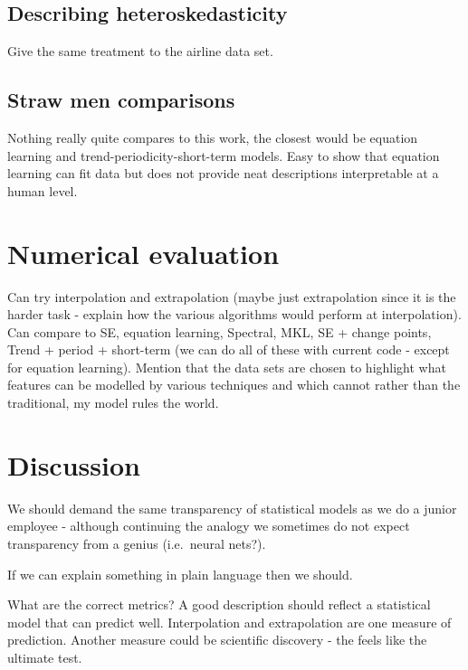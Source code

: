 \documentclass{article}
\def\ie{i.e.\ }
\def\eg{e.g.\ }
\begin{document}
\subsection{Describing heteroskedasticity}
\label{sec:airline}

Give the same treatment to the airline data set.

\subsection{Straw men comparisons}

Nothing really quite compares to this work, the closest would be equation learning and trend-periodicity-short-term models.
Easy to show that equation learning can fit data but does not provide neat descriptions interpretable at a human level.

\section{Numerical evaluation}

Can try interpolation and extrapolation (maybe just extrapolation since it is the harder task - explain how the various algorithms would perform at interpolation).
Can compare to SE, equation learning, Spectral, MKL, SE + change points, Trend + period + short-term (we can do all of these with current code - except for equation learning).
Mention that the data sets are chosen to highlight what features can be modelled by various techniques and which cannot rather than the traditional, my model rules the world.



\section{Discussion}

We should demand the same transparency of statistical models as we do a junior employee - although continuing the analogy we sometimes do not expect transparency from a genius (\ie neural nets?).

If we can explain something in plain language then we should.

What are the correct metrics?
A good description should reflect a statistical model that can predict well.
Interpolation and extrapolation are one measure of prediction.
Another measure could be scientific discovery - the feels like the ultimate test.
\end{document}

